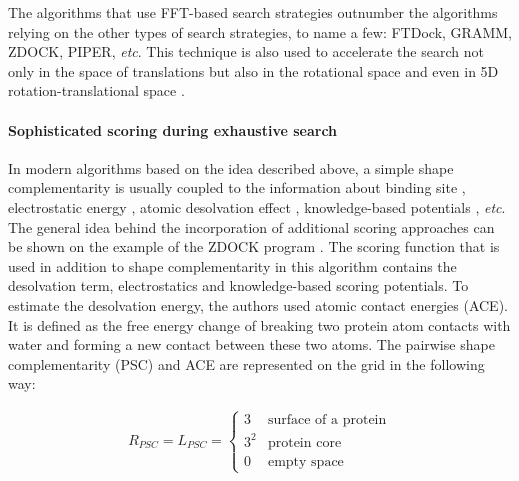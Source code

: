 
The algorithms that use FFT-based search strategies outnumber the algorithms relying on the other types of search strategies, 
to name a few: FTDock\cite{gabb1997modelling}, GRAMM\cite{vakser1997evaluation}, ZDOCK\cite{pierce2011accelerating}, PIPER\cite{kozakov2006piper}, \emph{etc}.
This technique is also used to accelerate the search not only in the space of translations but also in the rotational space \cite{garzon2009frodock,ritchie2000protein,ritchie2008recent} 
and even in 5D rotation-translational space .

\paragraph{Sophisticated scoring during exhaustive search}

In modern algorithms based on the idea described above, a simple shape complementarity is usually coupled to the information about binding site  \cite{ben2003weighted}, 
electrostatic energy \cite{gabb1997modelling}, atomic desolvation effect \cite{chen2002docking}, 
knowledge-based potentials \cite{mintseris2007integrating}, \emph{etc}.
The general idea behind the incorporation of additional scoring approaches can be shown on the example of the ZDOCK program \cite{mintseris2007integrating}.
The scoring function that is used in addition to shape complementarity in this algorithm contains the desolvation term, electrostatics and knowledge-based scoring
potentials.
To estimate the desolvation energy, the authors used atomic contact energies (ACE)\cite{chen2002docking}. It is defined as the free energy change of breaking two protein atom
contacts with water and forming a new contact between these two atoms. The pairwise shape complementarity (PSC) and ACE are represented on the grid 
in the following way:

\begin{eqnarray*}
 R_{PSC}=L_{PSC}=\begin{cases}
                  3 & \mbox{surface of a protein}\\
                  3^2 & \mbox{protein core}\\
                  0 & \mbox{empty space}
                 \end{cases}
\end{eqnarray*}

